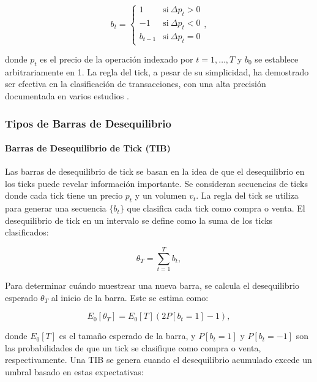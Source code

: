 \documentclass[a4paper,12pt, twoside]{report}
\begin{document}
\begin{equation}
b_t =
\begin{cases}
1 & \text{si} \ \Delta p_t > 0 \\
-1 & \text{si} \ \Delta p_t < 0 \\
b_{t-1} & \text{si} \ \Delta p_t = 0
\end{cases},
\end{equation}

donde \(p_t\) es el precio de la operación indexado por \(t = 1,\ldots,T\) y \(b_0\) se establece arbitrariamente en 1. 
La regla del tick, a pesar de su simplicidad, ha demostrado ser efectiva en la clasificación de transacciones, con una 
alta precisión documentada en varios estudios \cite{aitken1996accuracy}.

\subsubsection{Tipos de Barras de Desequilibrio}

\paragraph{Barras de Desequilibrio de Tick (TIB)}

Las barras de desequilibrio de tick se basan en la idea de que el desequilibrio en los ticks puede revelar información 
importante. Se consideran secuencias de ticks donde cada tick tiene un precio \(p_t\) y un volumen \(v_t\). La regla del tick 
se utiliza para generar una secuencia \(\{b_t\}\) que clasifica cada tick como compra o venta. El desequilibrio de tick en un 
intervalo se define como la suma de los ticks clasificados:

\begin{equation}
\theta_T = \sum_{t=1}^{T} b_t,
\end{equation}

Para determinar cuándo muestrear una nueva barra, se calcula el desequilibrio esperado \(\theta_T\) al inicio de la barra. 
Este se estima como:

\begin{equation}
E_0[\theta_T] = E_0[T](2P[b_t = 1] - 1),
\end{equation}

donde \(E_0[T]\) es el tamaño esperado de la barra, y \(P[b_t = 1]\) y \(P[b_t = -1]\) son las probabilidades de que un tick 
se clasifique como compra o venta, respectivamente. Una TIB se genera cuando el desequilibrio acumulado excede un umbral basado 
en estas expectativas:
\end{document}
